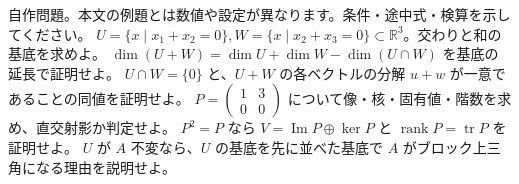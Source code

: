 \documentclass[11pt]{article}
\begin{document}
自作問題。本文の例題とは数値や設定が異なります。条件・途中式・検算を示してください。
\problem[平面の交わり]
$U=\{x\mid x_1+x_2=0\},W=\{x\mid x_2+x_3=0\}\subset\mathbb R^3$。交わりと和の基底を求めよ。
\workspace{45mm}
\problem[次元公式の証明]
$\dim(U+W)=\dim U+\dim W-\dim(U\cap W)$ を基底の延長で証明せよ。
\workspace{45mm}
\newpage
\problem[直和の一意性]
$U\cap W=\{0\}$ と、$U+W$ の各ベクトルの分解 $u+w$ が一意であることの同値を証明せよ。
\workspace{45mm}
\problem[斜めの射影]
$P=\begin{pmatrix}1&3\\0&0\end{pmatrix}$ について像・核・固有値・階数を求め、直交射影か判定せよ。
\workspace{45mm}
\newpage
\problem[冪等行列の分解]
$P^2=P$ なら $V=\operatorname{Im}P\oplus\ker P$ と $\operatorname{rank}P=\operatorname{tr}P$ を証明せよ。
\workspace{45mm}
\problem[不変部分空間]
$U$ が $A$ 不変なら、$U$ の基底を先に並べた基底で $A$ がブロック上三角になる理由を説明せよ。
\workspace{45mm}
\end{document}
